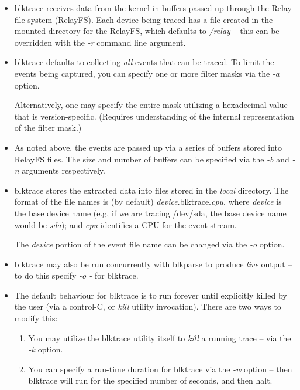 \documentclass{article}
\begin{document}
\begin{itemize}
  \item blktrace receives data from the kernel in buffers passed up
  through the Relay file system (RelayFS). Each device being traced has
  a file created in the mounted directory for the RelayFS, which defaults
  to \emph{/relay} -- this can be overridden with the \emph{-r} command
  line argument.
  
  \item blktrace defaults to collecting \emph{all} events that can be
  traced. To limit the events being captured, you can specify one or
  more filter masks via the \emph{-a} option.

  Alternatively, one may specify the entire mask utilizing a hexadecimal
  value that is version-specific. (Requires understanding of the internal
  representation of the filter mask.)

  \item As noted above, the events are passed up via a series of buffers
  stored into RelayFS files. The size and number of buffers can be
  specified via the \emph{-b} and \emph{-n} arguments respectively.

  \item blktrace stores the extracted data into files stored in the
  \emph{local} directory. The format of the file names is (by default)
  \emph{device}.blktrace.\emph{cpu}, where \emph{device} is the base
  device name (e.g, if we are tracing /dev/sda, the base device name would
  be \emph{sda}); and \emph{cpu} identifies a CPU for the event stream.

  The \emph{device} portion of the event file name can be changed via
  the \emph{-o} option.

  \item blktrace may also be run concurrently with blkparse to produce
  \emph{live} output -- to do this specify \emph{-o -} for blktrace.

  \item The default behaviour for blktrace is to run forever until explicitly killed by the user (via a control-C, or \emph{kill} utility invocation). There are two ways to modify this: 

  \begin{enumerate}
    \item You may utilize the blktrace utility itself to \emph{kill}
    a running trace -- via the \emph{-k} option.

    \item You can specify a run-time duration for blktrace via the
    \emph{-w} option -- then blktrace will run for the specified number
    of seconds, and then halt.
  \end{enumerate}
\end{itemize}
\end{document}

